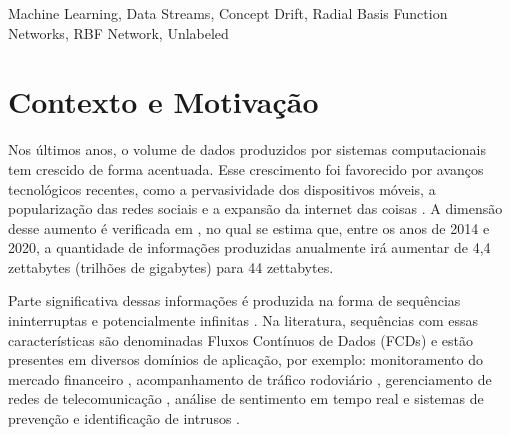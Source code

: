 \documentclass[qual, classic, a4paper]{ufbathesis}
\begin{document}
\abstract

\blindtext

\begin{keywords}
    Machine Learning, Data Streams, Concept Drift, Radial Basis Function Networks, RBF Network, Unlabeled
\end{keywords}


\tableofcontents

\listoffigures

\listoftables

\listofalgorithms

\mainmatter

% 
% 
% 
%

 \label{introducao}

\section{Contexto e Motivação}

Nos últimos anos, o volume de dados produzidos por sistemas computacionais tem crescido de forma acentuada.
%
Esse crescimento foi favorecido por avanços tecnológicos recentes, como  
a pervasividade dos dispositivos móveis,
a popularização das redes sociais e 
a expansão da internet das coisas \cite{Cohen:BigData:2009:MSN:1687553.1687576}.
%
A dimensão desse aumento é verificada em \cite{idc_report}, 
no qual se estima que, entre os anos de 2014 e 2020,
a quantidade de informações produzidas anualmente irá aumentar de 4,4 zettabytes (trilhões de gigabytes) para 44 zettabytes.

Parte significativa dessas informações é produzida na forma de sequências ininterruptas e potencialmente infinitas \cite{Aggarwal:2006:DSM:1196418}.
%
Na literatura, sequências com essas características são denominadas Fluxos Contínuos de Dados (FCDs) e estão presentes em diversos domínios de aplicação, por exemplo:
monitoramento do mercado financeiro \cite{ZHOU:2015},
acompanhamento de tráfico rodoviário \cite{Wang:2015:EOV:2843092.2843464}, 
gerenciamento de redes de telecomunicação \cite{delattre2015method}, 
análise de sentimento em tempo real \cite{KRANJC2015187} e 
sistemas de prevenção e identificação de intrusos \cite{KENKRE:PAI:COLACO:2015}.
\end{document}
